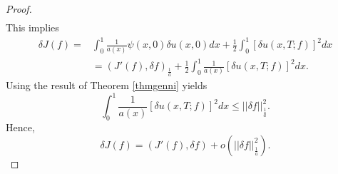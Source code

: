 \documentclass[reqno]{amsart}
\theoremstyle{plain}
\theoremstyle{remark}
\numberwithin{equation}{section}
\begin{document}
\begin{proof}
\begin{equation*}
\begin{aligned}
\end{aligned}
\end{equation*}
This implies 
\begin{equation*}
    \begin{aligned}
        \delta J(f)=&\int_{ 0}^1\frac{1}{a(x)}\psi(x,0)\delta u(x,0) dx+\frac{1}{2}\int_{0}^1 \left[\delta u(x,T;f)\right]^2 dx\\&
        =(J'(f),\delta f)_{\frac{1}{a}}+\frac{1}{2}\int_{0}^1 \frac{1}{a(x)} \left[\delta u(x,T;f)\right]^2 dx.
    \end{aligned}
\end{equation*}
Using the result of Theorem \ref{thmgenni} yields 
$$ \int_{0}^1 \frac{1}{a(x)}\left[\delta u(x,T;f)\right]^2 dx\leqslant \vert \vert \delta f\vert \vert_{\frac{1}{a}}^2. $$
Hence, 
$$\delta J(f)=(J'(f),\delta f)+o\left(\vert \vert \delta f\vert \vert_{\frac{1}{a}}^2\right).$$
\end{proof}
\end{document}
